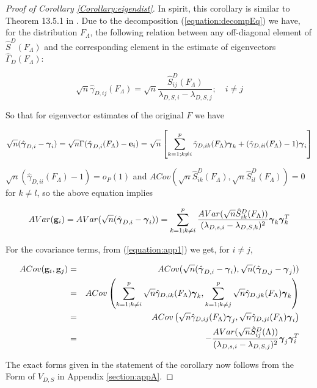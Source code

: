 \documentclass[fleqn,11pt]{article}
\begin{document}
\begin{proof}[Proof of Corollary \ref{Corollary:eigendist}]
In spirit, this corollary is similar to Theorem 13.5.1 in \cite{anderson}. Due to the decomposition (\ref{equation:decompEq}) we have, for the distribution $F_\Lambda$, the following relation between any off-diagonal element of $\hat S^D(F_\Lambda)$ and the corresponding element in the estimate of eigenvectors $\hat\Gamma_D (F_\Lambda)$:

$$ \sqrt n \hat\gamma_{D,ij} (F_\Lambda) = \sqrt n \frac{\hat S^D_{ij} (F_\Lambda)}{\lambda_{D,S,i} - \lambda_{D,S,j}}; \quad i \neq j$$

So that for eigenvector estimates of the original $F$ we have

\begin{equation} \label{equation:app1}
\sqrt n (\hat{{\boldsymbol{\gamma}}}_{D,i} - {\boldsymbol{\gamma}}_i) = \sqrt n \Gamma (\hat {{\boldsymbol{\gamma}}}_{D,i}(F_\Lambda) - {\bf{e}}_i ) = \sqrt n \left[ \sum_{k=1; k \neq i}^p \hat \gamma_{D,ik}(F_\Lambda){\boldsymbol{\gamma}}_k + (\hat \gamma_{D,ii}(F_\Lambda) - 1){\boldsymbol{\gamma}}_i \right]
\end{equation}

$\sqrt n (\hat \gamma_{D,ii}(F_\Lambda) - 1) =  o_P(1)$ and $ACov(\sqrt n \hat S^D_{ik}(F_\Lambda), \sqrt n \hat S^D_{il}(F_\Lambda)) = 0$ for $k \neq l$, so the above equation implies

$$ AVar({\bf{g}}_i) = AVar (\sqrt n (\hat{{\boldsymbol{\gamma}}}_{D,i} - {\boldsymbol{\gamma}}_i)) = \sum_{k=1; k \neq i}^p \frac{AVar(\sqrt n \hat S^D_{ik}(F_\Lambda))}{(\lambda_{D,s,i} - \lambda_{D,S,k})^2} {\boldsymbol{\gamma}}_k {\boldsymbol{\gamma}}_k^T $$

For the covariance terms, from (\ref{equation:app1}) we get, for $i \neq j$,

\begin{eqnarray*}
ACov({\bf{g}}_i, {\bf{g}}_j) &=& ACov (\sqrt n (\hat{{\boldsymbol{\gamma}}}_{D,i} - {\boldsymbol{\gamma}}_i), \sqrt n (\hat{{\boldsymbol{\gamma}}}_{D,j} - {\boldsymbol{\gamma}}_j))\\
&=& ACov \left( \sum_{k=1; k \neq i}^p \sqrt n \hat \gamma_{D,ik}(F_\Lambda){\boldsymbol{\gamma}}_k, \sum_{k=1; k \neq j}^p \sqrt n \hat \gamma_{D,jk}(F_\Lambda){\boldsymbol{\gamma}}_k \right)\\
&=& ACov \left( \sqrt n \hat \gamma_{D,ij}(F_\Lambda){\boldsymbol{\gamma}}_j, \sqrt n \hat \gamma_{D,ji}(F_\Lambda){\boldsymbol{\gamma}}_i \right)\\
&=& - \frac{AVar(\sqrt n \hat S^D_{ij}(\Lambda))}{(\lambda_{D,s,i} - \lambda_{D,S,j})^2} {\boldsymbol{\gamma}}_j {\boldsymbol{\gamma}}_i^T
\end{eqnarray*}

The exact forms given in the statement of the corollary now follows from the  Form of $V_{D,S}$ in Appendix \ref{section:appA}.


\end{proof}
\end{document}
